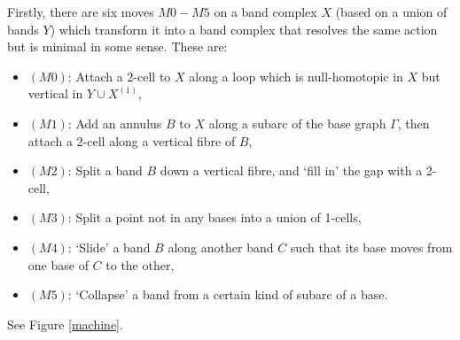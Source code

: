 Firstly, there are six moves $M0-M5$ on a band complex $X$ (based on a union of bands $Y$) which transform it into a band complex that resolves the same action but is minimal in some sense. These are:
\begin{itemize}
    \item $(M0)$: Attach a 2-cell to $X$ along a loop which is null-homotopic in $X$ but vertical in $Y\cup X^{(1)}$,
    \item $(M1)$: Add an annulus $B$ to $X$ along a subarc of the base graph $\Gamma$, then attach a 2-cell along a vertical fibre of $B$,
    \item $(M2)$: Split a band $B$ down a vertical fibre, and `fill in' the gap with a 2-cell,
    \item $(M3)$: Split a point not in any bases into a union of 1-cells,
    \item $(M4)$: `Slide' a band $B$ along another band $C$ such that its base moves from one base of $C$ to the other,
    \item $(M5)$: `Collapse' a band from a certain kind of subarc of a base.
\end{itemize}
See Figure \ref{machine}.
